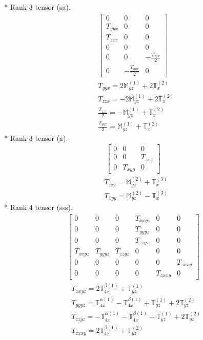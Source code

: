 \documentclass[fleqn,8pt,landscape]{jsarticle}
\begin{document}
* Rank 3 tensor (sa).
\begin{align*}
\begin{bmatrix} 0 & 0 & 0 \\ T_{yyx} & 0 & 0 \\ T_{zzx} & 0 & 0 \\ 0 & 0 & 0 \\ 0 & 0 & - \frac{T_{zzx}}{2} \\ 0 & - \frac{T_{yyx}}{2} & 0 \end{bmatrix}
\end{align*}
\begin{align*}
& T_{yyx} = 2 \mathbb{M}_{yz}^{(1)} + 2 \mathbb{T}_{x}^{(2)} \\
& T_{zzx} = - 2 \mathbb{M}_{yz}^{(1)} + 2 \mathbb{T}_{x}^{(2)} \\
& \frac{T_{zzx}}{2} = - \mathbb{M}_{yz}^{(1)} + \mathbb{T}_{x}^{(2)} \\
& \frac{T_{yyx}}{2} = \mathbb{M}_{yz}^{(1)} + \mathbb{T}_{x}^{(2)}
\end{align*}
* Rank 3 tensor (a).
\begin{align*}
\begin{bmatrix} 0 & 0 & 0 \\ 0 & 0 & T_{zxz} \\ 0 & T_{xyy} & 0 \end{bmatrix}
\end{align*}
\begin{align*}
& T_{zxz} = \mathbb{M}_{yz}^{(2)} + \mathbb{T}_{x}^{(3)} \\
& T_{xyy} = \mathbb{M}_{yz}^{(2)} - \mathbb{T}_{x}^{(3)}
\end{align*}
* Rank 4 tensor (sss).
\begin{align*}
\begin{bmatrix} 0 & 0 & 0 & T_{xxyz} & 0 & 0 \\ 0 & 0 & 0 & T_{yyyz} & 0 & 0 \\ 0 & 0 & 0 & T_{zzyz} & 0 & 0 \\ T_{xxyz} & T_{yyyz} & T_{zzyz} & 0 & 0 & 0 \\ 0 & 0 & 0 & 0 & 0 & T_{zxxy} \\ 0 & 0 & 0 & 0 & T_{zxxy} & 0 \end{bmatrix}
\end{align*}
\begin{align*}
& T_{xxyz} = 2 \mathbb{T}_{4x}^{\beta(1)} + \mathbb{T}_{yz}^{(1)} \\
& T_{yyyz} = \mathbb{T}_{4x}^{\alpha(1)} - \mathbb{T}_{4x}^{\beta(1)} + \mathbb{T}_{yz}^{(1)} + 2 \mathbb{T}_{yz}^{(2)} \\
& T_{zzyz} = - \mathbb{T}_{4x}^{\alpha(1)} - \mathbb{T}_{4x}^{\beta(1)} + \mathbb{T}_{yz}^{(1)} + 2 \mathbb{T}_{yz}^{(2)} \\
& T_{zxxy} = 2 \mathbb{T}_{4x}^{\beta(1)} + \mathbb{T}_{yz}^{(2)}
\end{align*}
\end{document}
